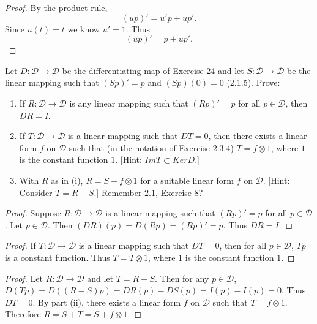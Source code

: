 \begin{proof}
    By the product rule,
    \[
        (up)' = u'p + up'.
    \]
    Since $u(t) = t$ we know $u' = 1$. Thus
    \[
        (up)' = p + up'.
    \]
\end{proof}

\begin{tcolorbox}[title=Problem 25, breakable]
    Let $D : \mathcal{D} \longrightarrow \mathcal{D}$ be the differentiating map of Exercise 24
        and let $S : \mathcal{D} \longrightarrow \mathcal{D}$ be the linear mapping such that 
        $(Sp)' = p$ and $(Sp)(0) = 0$ (2.1.5). Prove:
        \begin{enumerate}
            \item If $R : \mathcal{D} \longrightarrow \mathcal{D}$ is any linear mapping such that $(Rp)' = p$ for all $p \in \mathcal{D}$, then $DR = I$.
            \item If $T : \mathcal{D} \longrightarrow \mathcal{D}$ is a linear mapping such that $DT = 0$, then there exists a linear form $f$ on $\mathcal{D}$
                    such that (in the notation of Exercise 2.3.4) $T = f \otimes 1$, where $1$ is the constant function $1$. [Hint: $Im T \subset Ker D$.]
            \item With $R$ as in (i), $R = S + f \otimes 1$ for a suitable linear form $f$ on $\mathcal{D}$. [Hint: Consider $T = R - S$.] Remember $2.1$, Exercise 8?
        \end{enumerate}
\end{tcolorbox}

\begin{proof}
    Suppose $R : \mathcal{D} \longrightarrow \mathcal{D}$ is a linear mapping such that $(Rp)' = p$ for all $p \in \mathcal{D}$.
    Let $p \in \mathcal{D}$. Then $(DR)(p) = D(Rp) = (Rp)' = p$.  
    Thus $DR = I$.
\end{proof}

\begin{proof}
    If $T : \mathcal{D} \longrightarrow \mathcal{D}$ is a linear mapping such that $DT = 0$,  
    then for all $p \in \mathcal{D}$, $Tp$ is a constant function.  
    Thus $T = T \otimes 1$, where $1$ is the constant function $1$.
\end{proof}

\begin{proof}
    Let $R : \mathcal{D} \longrightarrow \mathcal{D}$ and let $T = R - S$.
    Then for any $p \in \mathcal{D}$, $D(Tp) = D((R - S)p) = DR(p) - DS(p) = I(p) - I(p) = 0$.
    Thus $DT = 0$.
    By part (ii), there exists a linear form $f$ on $\mathcal{D}$ such that $T = f \otimes 1$.
    Therefore $R = S + T = S + f \otimes 1$.
\end{proof}

